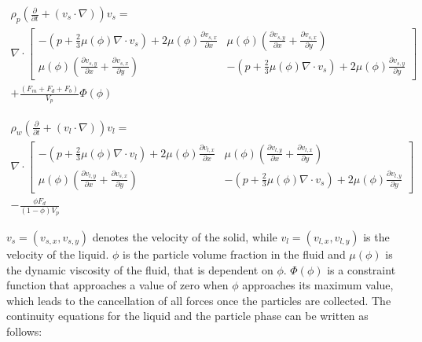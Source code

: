 \begin{multline} 
\rho_{p}\left(\frac{\partial}{\partial t}+(v_{s}\cdotp\nabla)\right)v_{s} = \\ \nabla\cdotp \begin{bmatrix} -\left(p+\frac{2}{3}\mu(\phi)\nabla\cdotp v_{s}\right)+2\mu(\phi)\frac{\partial v_{s,x}}{\partial x} & \mu(\phi)\left(\frac{\partial v_{s,y}}{\partial x}+\frac{\partial v_{s,x}}{\partial y}\right) \\ \mu(\phi)\left(\frac{\partial v_{s,y}}{\partial x}+\frac{\partial v_{s,x}}{\partial y}\right)  &  -\left(p+\frac{2}{3}\mu(\phi)\nabla\cdotp v_{s}\right)+2\mu(\phi)\frac{\partial v_{s,y}}{\partial y}\end{bmatrix}\\ + \frac{(F_{m}+F_{d}+F_{b})}{V_{p}}\Phi(\phi)
\label{eq:NS_part1}
\end{multline}

\begin{multline} 
\rho_{w}\left(\frac{\partial}{\partial t}+(v_{l}\cdotp\nabla)\right)v_{l} = \\ \nabla\cdotp \begin{bmatrix} -\left(p+\frac{2}{3}\mu(\phi)\nabla\cdotp v_{l}\right)+2\mu(\phi)\frac{\partial v_{l,x}}{\partial x} & \mu(\phi)\left(\frac{\partial v_{l,y}}{\partial x}+\frac{\partial v_{l,x}}{\partial y}\right) \\ \mu(\phi)\left(\frac{\partial v_{l,y}}{\partial x}+\frac{\partial v_{s,x}}{\partial y}\right)  &  -\left(p+\frac{2}{3}\mu(\phi)\nabla\cdotp v_{s}\right)+2\mu(\phi)\frac{\partial v_{l,y}}{\partial y}\end{bmatrix}\\ - \frac{\phi F_{d}}{(1-\phi)V_{p}}
\label{eq:NS_part2}
\end{multline}

$v_{s}=(v_{s,x},v_{s,y})$ denotes the velocity of the solid, while  $v_{l}=(v_{l,x},v_{l,y})$ is the velocity of the liquid. $\phi$ is the particle volume fraction in the fluid and $\mu(\phi)$ is the dynamic viscosity of the fluid, that is dependent on $\phi$. $\Phi(\phi)$ is a constraint function that approaches a value of zero when $\phi$ approaches its maximum value, which leads to the cancellation of all forces once the particles are collected. The continuity equations for the liquid and the particle phase can be written as follows:  

